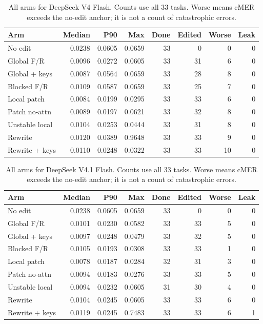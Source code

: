 \begin{table}[htbp]\centering\small
\caption{All arms for DeepSeek V4 Flash. Counts use all 33 tasks. Worse means cMER exceeds the no-edit anchor; it is not a count of catastrophic errors.}
\begin{tabular}{lrrrrrrr}\toprule
Arm & Median & P90 & Max & Done & Edited & Worse & Leak\\\midrule
No edit & 0.0238 & 0.0605 & 0.0659 & 33 & 0 & 0 & 0\\
Global F/R & 0.0096 & 0.0272 & 0.0605 & 33 & 31 & 6 & 0\\
Global + keys & 0.0087 & 0.0564 & 0.0659 & 33 & 28 & 8 & 0\\
Blocked F/R & 0.0109 & 0.0587 & 0.0659 & 33 & 25 & 7 & 0\\
Local patch & 0.0084 & 0.0199 & 0.0295 & 33 & 33 & 6 & 0\\
Patch no-attn & 0.0089 & 0.0197 & 0.0621 & 33 & 32 & 8 & 0\\
Unstable local & 0.0104 & 0.0253 & 0.0444 & 33 & 31 & 8 & 0\\
Rewrite & 0.0120 & 0.0389 & 0.9648 & 33 & 33 & 9 & 0\\
Rewrite + keys & 0.0110 & 0.0248 & 0.0322 & 33 & 33 & 10 & 0\\
\bottomrule\end{tabular}\end{table}
\begin{table}[htbp]\centering\small
\caption{All arms for DeepSeek V4.1 Flash. Counts use all 33 tasks. Worse means cMER exceeds the no-edit anchor; it is not a count of catastrophic errors.}
\begin{tabular}{lrrrrrrr}\toprule
Arm & Median & P90 & Max & Done & Edited & Worse & Leak\\\midrule
No edit & 0.0238 & 0.0605 & 0.0659 & 33 & 0 & 0 & 0\\
Global F/R & 0.0101 & 0.0230 & 0.0582 & 33 & 33 & 5 & 0\\
Global + keys & 0.0097 & 0.0248 & 0.0479 & 33 & 32 & 5 & 0\\
Blocked F/R & 0.0105 & 0.0193 & 0.0308 & 33 & 33 & 1 & 0\\
Local patch & 0.0078 & 0.0187 & 0.0284 & 32 & 31 & 3 & 0\\
Patch no-attn & 0.0094 & 0.0183 & 0.0276 & 33 & 33 & 5 & 0\\
Unstable local & 0.0094 & 0.0232 & 0.0605 & 31 & 30 & 4 & 0\\
Rewrite & 0.0104 & 0.0245 & 0.0605 & 33 & 33 & 6 & 0\\
Rewrite + keys & 0.0119 & 0.0245 & 0.7483 & 33 & 33 & 6 & 1\\
\bottomrule\end{tabular}\end{table}
